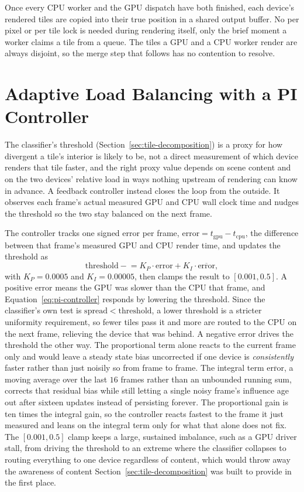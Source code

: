 \documentclass{ftndiplomski}
\begin{document}
Once every CPU worker and the GPU dispatch have both finished, each device's rendered tiles are
copied into their true position in a shared output buffer. No per pixel or per tile lock is
needed during rendering itself, only the brief moment a worker claims a tile from a queue. The
tiles a GPU and a CPU worker render are always disjoint, so the merge step that follows has no
contention to resolve.

\section{Adaptive Load Balancing with a PI Controller}
\label{sec:load-balancing}

The classifier's threshold (Section~\ref{sec:tile-decomposition}) is a proxy for how divergent a
tile's interior is likely to be, not a direct measurement of which device renders that tile
faster, and the right proxy value depends on scene content and on the two devices' relative load
in ways nothing upstream of rendering can know in advance. A feedback controller instead closes
the loop from the outside. It observes each frame's actual measured GPU and CPU wall clock time
and nudges the threshold so the two stay balanced on the next frame.

The controller tracks one signed error per frame, $\mathrm{error} = t_{\mathrm{gpu}} -
t_{\mathrm{cpu}}$, the difference between that frame's measured GPU and CPU render time, and
updates the threshold as
\begin{equation}
  \label{eq:pi-controller}
  \mathrm{threshold} \mathrel{-}= K_P \cdot \mathrm{error} + K_I \cdot \overline{\mathrm{error}},
\end{equation}
with $K_P = 0.0005$ and $K_I = 0.00005$, then clamps the result to $[0.001, 0.5]$. A positive
error means the GPU was slower than the CPU that frame, and Equation~\ref{eq:pi-controller}
responds by lowering the threshold. Since the classifier's own test is $\mathrm{spread} <
\mathrm{threshold}$, a lower threshold is a stricter uniformity requirement, so fewer tiles pass
it and more are routed to the CPU on the next frame, relieving the device that was behind. A
negative error drives the threshold the other way. The proportional term alone reacts to the
current frame only and would leave a steady state bias uncorrected if one device is
\emph{consistently} faster rather than just noisily so from frame to frame. The integral term
$\overline{\mathrm{error}}$, a moving average over the last $16$ frames rather than an unbounded
running sum, corrects that residual bias while still letting a single
noisy frame's influence age out after sixteen updates instead of persisting forever. The
proportional gain is ten times the integral gain, so the controller reacts fastest to the
frame it just measured and leans on the integral term only for what that alone does not fix. The
$[0.001, 0.5]$ clamp keeps a large, sustained imbalance, such as a GPU driver stall, from driving
the threshold to an extreme where the classifier collapses to routing everything to one device
regardless of content, which would throw away the awareness of content Section~\ref{sec:tile-decomposition}
was built to provide in the first place.
\end{document}
